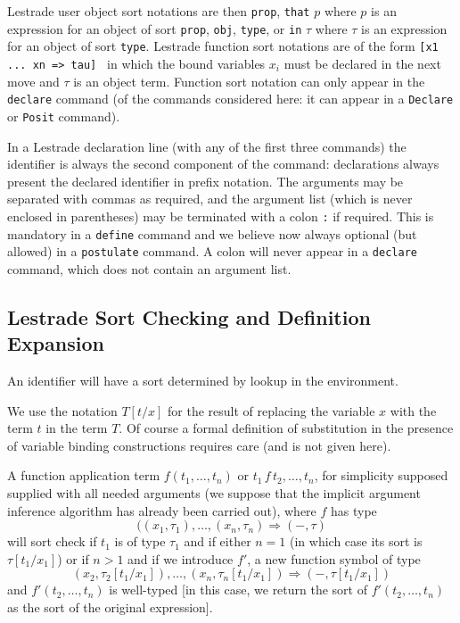 \documentclass[12pt]{article}
\begin{document}
Lestrade user object sort notations are then {\tt prop}, {\tt that} $p$ where $p$ is an expression for an object of sort {\tt prop}, {\tt obj},
{\tt type}, or {\tt in} $\tau$ where $\tau$ is an expression for an object  of sort {\tt type}.  Lestrade function sort notations are of the form {\tt [x1 ... xn => tau] } in which the bound variables $x_i$ must be declared in the next move and $\tau$ is an object term.  Function sort notation can only appear in the {\tt declare} command (of the commands considered here:  it can appear in a {\tt Declare} or {\tt Posit} command).

In a Lestrade declaration line (with any of the first three commands) the identifier is always the second component of the command:  declarations always present the declared identifier in prefix notation.  The arguments
may be separated with commas as required, and the argument list (which is never enclosed in parentheses) may be terminated with a colon {\tt :} if required.  This is mandatory in a {\tt define} command and we believe now always optional (but allowed) in a {\tt postulate} command.  A colon will never appear in a {\tt declare} command, which does not contain an argument list.

\subsection{Lestrade Sort Checking and Definition Expansion}

An identifier will have a sort determined by lookup in the environment.

We use the notation $T[t/x]$ for the result of replacing the variable $x$ with the term $t$ in the term $T$.  Of course a formal definition of substitution in the presence of variable binding constructions requires care (and is not given here).

A function application term $f(t_1,\ldots,t_n)$ or $t_1\, f\, t_2,\ldots,t_n$, for simplicity supposed supplied with all needed arguments (we suppose that the implicit argument inference algorithm has already been carried out), where $f$ has type $$((x_1,\tau_1),\ldots,(x_n,\tau_n) \Rightarrow (-,\tau)$$ will sort check if $t_1$ is of type $\tau_1$
and if either $n=1$ (in which case its sort is $\tau[t_1/x_1]$) or if $n>1$ and if we introduce $f'$, a new function symbol of type
$$(x_2,\tau_2[t_1/x_1]),\ldots,(x_n,\tau_n[t_1/x_1]) \Rightarrow (-,\tau[t_1/x_1])$$ and $f'(t_2,\ldots,t_n)$ is well-typed [in this case, we return the sort of $f'(t_2,\ldots,t_n)$ as the sort of the original expression].
\end{document}
